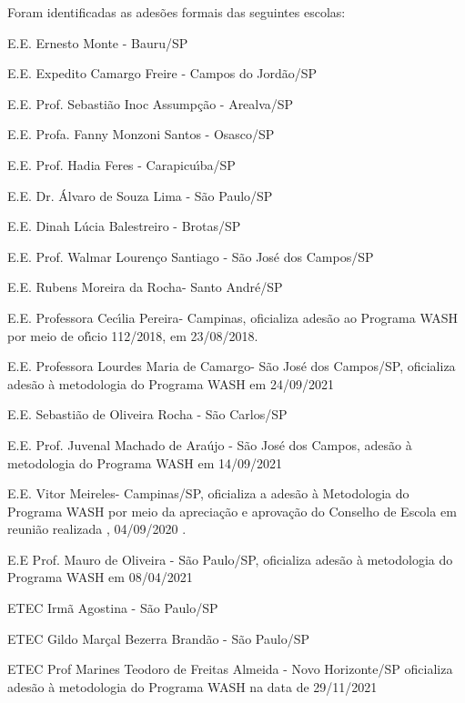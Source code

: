 \documentclass[
12pt,		%
openright,	%
twoside,  %
a4paper,			%
chapter=TITLE,		%
english,			%
french,				%
spanish,			%
brazil				%
]{USPSC-classe/USPSC}
\begin{document}
Foram identificadas as ades\~oes formais das seguintes escolas:


















\begin{alineas}
\item E.E. Ernesto Monte - Bauru/SP
\item E.E. Expedito Camargo Freire - Campos do Jord\~ao/SP
\item E.E. Prof. Sebasti\~ao Inoc Assump\c{c}\~ao - Arealva/SP
\item E.E. Profa. Fanny Monzoni Santos - Osasco/SP
\item E.E. Prof. Hadia Feres - Carapicu\'{\i}ba/SP
\item E.E. Dr. \'Alvaro de Souza Lima - S\~ao Paulo/SP
\item E.E. Dinah L\'ucia Balestreiro - Brotas/SP  
\item E.E. Prof. Walmar Louren\c{c}o Santiago - S\~ao Jos\'e dos Campos/SP
\item E.E. Rubens Moreira da Rocha- Santo Andr\'e/SP
\item E.E. Professora Cec\'{\i}lia Pereira- Campinas, oficializa ades\~ao ao Programa WASH por meio de of\'{\i}cio 112/2018, em 23/08/2018.
\item E.E. Professora Lourdes Maria de Camargo- S\~ao Jos\'e dos Campos/SP, oficializa ades\~ao \`a metodologia do Programa WASH em 24/09/2021
\item E.E. Sebasti\~ao de Oliveira Rocha - S\~ao Carlos/SP
\item E.E. Prof. Juvenal Machado de Ara\'ujo - S\~ao Jos\'e dos Campos, ades\~ao \`a metodologia do Programa WASH em 14/09/2021
\item E.E. Vitor Meireles- Campinas/SP, oficializa a ades\~ao \`a Metodologia do Programa WASH  por meio da aprecia\c{c}\~ao e aprova\c{c}\~ao do Conselho de Escola em reuni\~ao realizada , 04/09/2020 .
\item E.E Prof. Mauro de Oliveira - S\~ao Paulo/SP, oficializa ades\~ao \`a metodologia do Programa WASH em 08/04/2021
\item ETEC Irm\~a Agostina - S\~ao Paulo/SP
\item ETEC Gildo Mar\c{c}al Bezerra Brand\~ao - S\~ao Paulo/SP
\item ETEC Prof Marines Teodoro de Freitas Almeida - Novo Horizonte/SP oficializa ades\~ao \`a metodologia do Programa WASH na  data de 29/11/2021

\end{alineas}
\end{document}
